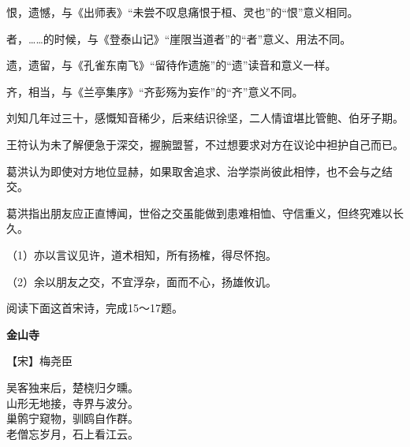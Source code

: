\documentclass[11pt,a4paper]{ctexart}
\begin{document}

\begin{choices}
\item 恨，遗憾，与《出师表》“未尝不叹息痛恨于桓、灵也”的“恨”意义相同。
\item 者，……的时候，与《登泰山记》“崖限当道者”的“者”意义、用法不同。
\item 遗，遗留，与《孔雀东南飞》“留待作遗施”的“遗”读音和意义一样。
\item 齐，相当，与《兰亭集序》“齐彭殇为妄作”的“齐”意义不同。
\end{choices}

\begin{choices}
\item 刘知几年过三十，感慨知音稀少，后来结识徐坚，二人情谊堪比管鲍、伯牙子期。
\item 王符认为未了解便急于深交，握腕盟誓，不过想要求对方在议论中袒护自己而已。
\item 葛洪认为即使对方地位显赫，如果取舍追求、治学崇尚彼此相悖，也不会与之结交。
\item 葛洪指出朋友应正直博闻，世俗之交虽能做到患难相恤、守信重义，但终究难以长久。
\end{choices}


（1）亦以言议见许，道术相知，所有扬榷，得尽怀抱。

（2）余以朋友之交，不宜浮杂，面而不心，扬雄攸讥。

\par\vspace{2.2em}


\par\vspace{2.2em}

阅读下面这首宋诗，完成15～17题。

\begin{center}{\bfseries 金山寺}\par\vspace{0.15em}【宋】梅尧臣\end{center}

\begin{poem}
吴客独来后，楚桡归夕曛。\\
山形无地接，寺界与波分。\\
巢鹘宁窥物，驯鸥自作群。\\
老僧忘岁月，石上看江云。
\end{poem}
\end{document}
